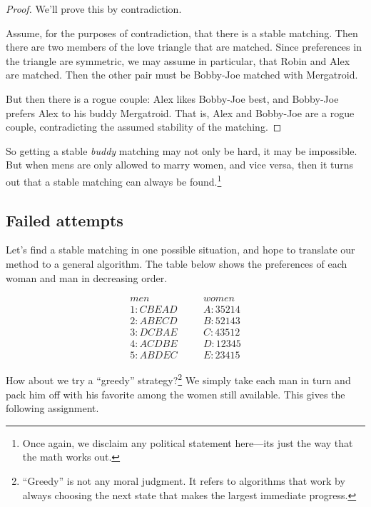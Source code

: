 \begin{proof}
We'll prove this by contradiction.

Assume, for the purposes of contradiction, that there is a stable
matching.  Then there are two members of the love triangle that are
matched.  Since preferences in the triangle are symmetric, we may assume
in particular, that Robin and Alex are matched.  Then the other pair must
be Bobby-Joe matched with Mergatroid.

But then there is a rogue couple: Alex likes Bobby-Joe best, and Bobby-Joe
prefers Alex to his buddy Mergatroid.  That is, Alex and Bobby-Joe are a
rogue couple, contradicting the assumed stability of the matching.
\end{proof}

So getting a stable \emph{buddy} matching may not only be hard, it may
be impossible.  But when mens are only allowed to marry women, and
vice versa, then it turns out that a stable matching can always be
found.\footnote{Once again, we disclaim any political statement
  here---its just the way that the math works out.}


\iffalse

\subsection{Failed attempts}

Let's find a stable matching in one possible situation, and hope to
translate our method to a general algorithm.  The table below shows the
preferences of each woman and man in decreasing order.

\begin{eqnarray*}
men & \quad & women \\
1 : C B E A D & \quad & A : 3 5 2 1 4 \\
2 : A B E C D & \quad & B : 5 2 1 4 3 \\
3 : D C B A E & \quad & C : 4 3 5 1 2 \\
4 : A C D B E & \quad & D : 1 2 3 4 5 \\
5 : A B D E C & \quad & E : 2 3 4 1 5
\end{eqnarray*}

How about we try a ``greedy'' strategy?\footnote{``Greedy'' is not any
moral judgment.  It refers to algorithms that work by always choosing the
next state that makes the largest immediate progress.}  We simply take
each man in turn and pack him off with his favorite among the women still
available.  This gives the following assignment.


